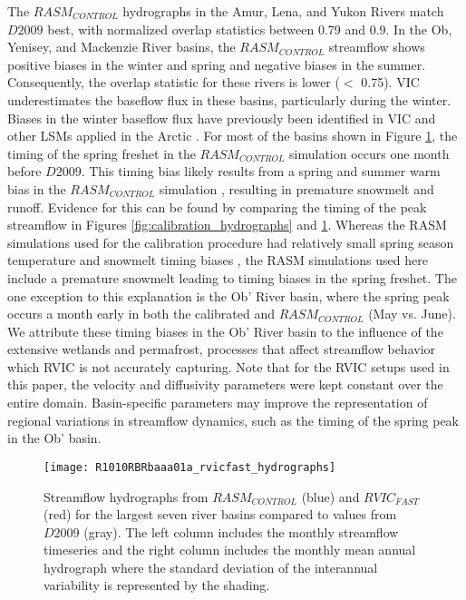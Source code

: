 The $RASM_{CONTROL}$ hydrographs in the Amur, Lena, and Yukon Rivers match $D2009$ best, with normalized overlap statistics between 0.79 and 0.9.
In the Ob, Yenisey, and Mackenzie River basins, the $RASM_{CONTROL}$ streamflow shows positive biases in the winter and spring and negative biases in the summer.
Consequently, the overlap statistic for these rivers is lower ($<$ 0.75).
VIC underestimates the baseflow flux in these basins, particularly during the winter.
Biases in the winter baseflow flux have previously been identified in VIC and other LSMs applied in the Arctic \citep{Slater_2007}.
For most of the basins shown in Figure \ref{fig:hydrographs}, the timing of the spring freshet in the $RASM_{CONTROL}$ simulation occurs one month before $D2009$.
This timing bias likely results from a spring and summer warm bias in the $RASM_{CONTROL}$ simulation \citep{Hamman_2016a,Cassano_2016}, resulting in premature snowmelt and runoff.
Evidence for this can be found by comparing the timing of the peak streamflow in Figures \ref{fig:calibration_hydrographs} and \ref{fig:hydrographs}.
Whereas the RASM simulations used for the calibration procedure had relatively small spring season temperature and snowmelt timing biases \citep{Hamman_2016a}, the RASM simulations used here include a premature snowmelt leading to timing biases in the spring freshet.
The one exception to this explanation is the Ob' River basin, where the spring peak occurs a month early in both the calibrated and $RASM_{CONTROL}$ (May vs. June).
We attribute these timing biases in the Ob' River basin to the influence of the extensive wetlands and permafrost, processes that affect streamflow behavior which RVIC is not accurately capturing.
Note that for the RVIC setups used in this paper, the velocity and diffusivity parameters were kept constant over the entire domain.
Basin-specific parameters may improve the representation of regional variations in streamflow dynamics, such as the timing of the spring peak in the Ob' basin.

\begin{figure}
    \centering
    \texttt{[image: R1010RBRbaaa01a\_rvicfast\_hydrographs]}
    \caption{Streamflow hydrographs from $RASM_{CONTROL}$ (blue) and $RVIC_{FAST}$ (red) for the largest seven river basins compared to values from $D2009$ (gray).
    The left column includes the monthly streamflow timeseries and the right column includes the monthly mean annual hydrograph where the standard deviation of the interannual variability is represented by the shading.}
    \label{fig:hydrographs}
\end{figure}

